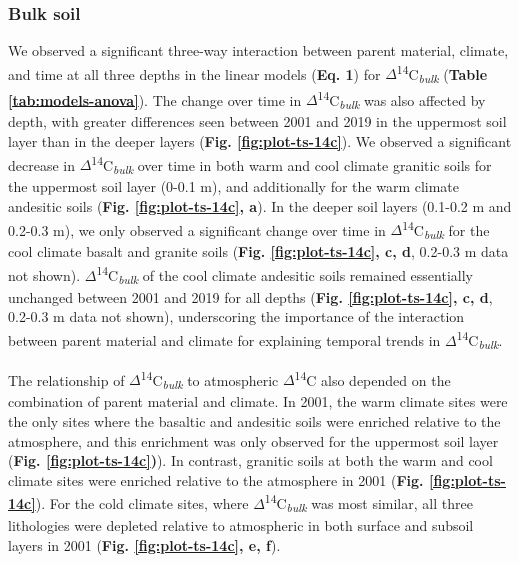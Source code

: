 \documentclass[english,man,floatsintext]{apa6}
\begin{document}
\endgroup{}

\hypertarget{bulk-soil-1}{%
\subsubsection{Bulk soil}\label{bulk-soil-1}}

We observed a significant three-way interaction between parent material, climate, and time at all three depths in the linear models (\textbf{Eq. 1}) for \(\Delta\)\textsuperscript{14}C\textsubscript{\emph{bulk}} (\textbf{Table \ref{tab:models-anova}}). The change over time in \(\Delta\)\textsuperscript{14}C\textsubscript{\emph{bulk}} was also affected by depth, with greater differences seen between 2001 and 2019 in the uppermost soil layer than in the deeper layers (\textbf{Fig. \ref{fig:plot-ts-14c}}). We observed a significant decrease in \(\Delta\)\textsuperscript{14}C\textsubscript{\emph{bulk}} over time in both warm and cool climate granitic soils for the uppermost soil layer (0-0.1 m), and additionally for the warm climate andesitic soils (\textbf{Fig. \ref{fig:plot-ts-14c}, a}). In the deeper soil layers (0.1-0.2 m and 0.2-0.3 m), we only observed a significant change over time in \(\Delta\)\textsuperscript{14}C\textsubscript{\emph{bulk}} for the cool climate basalt and granite soils (\textbf{Fig. \ref{fig:plot-ts-14c}, c, d}, 0.2-0.3 m data not shown). \(\Delta\)\textsuperscript{14}C\textsubscript{\emph{bulk}} of the cool climate andesitic soils remained essentially unchanged between 2001 and 2019 for all depths (\textbf{Fig. \ref{fig:plot-ts-14c}, c, d}, 0.2-0.3 m data not shown), underscoring the importance of the interaction between parent material and climate for explaining temporal trends in \(\Delta\)\textsuperscript{14}C\textsubscript{\emph{bulk}}.

The relationship of \(\Delta\)\textsuperscript{14}C\textsubscript{\emph{bulk}} to atmospheric \(\Delta\)\textsuperscript{14}C also depended on the combination of parent material and climate. In 2001, the warm climate sites were the only sites where the basaltic and andesitic soils were enriched relative to the atmosphere, and this enrichment was only observed for the uppermost soil layer (\textbf{Fig. \ref{fig:plot-ts-14c})}). In contrast, granitic soils at both the warm and cool climate sites were enriched relative to the atmosphere in 2001 (\textbf{Fig. \ref{fig:plot-ts-14c}}). For the cold climate sites, where \(\Delta\)\textsuperscript{14}C\textsubscript{\emph{bulk}} was most similar, all three lithologies were depleted relative to atmospheric in both surface and subsoil layers in 2001 (\textbf{Fig. \ref{fig:plot-ts-14c}, e, f}).
\end{document}
